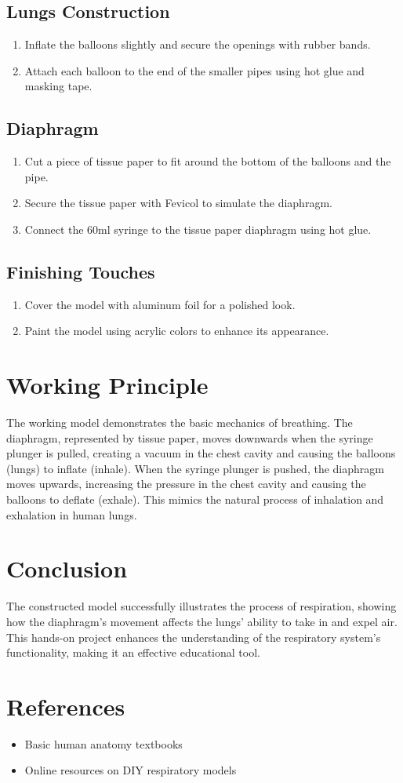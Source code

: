 \documentclass[12pt]{article}
\begin{document}
\subsection{Lungs Construction}
\begin{enumerate}
    \item Inflate the balloons slightly and secure the openings with rubber bands.
    \item Attach each balloon to the end of the smaller pipes using hot glue and masking tape.
\end{enumerate}

\subsection{Diaphragm}
\begin{enumerate}
    \item Cut a piece of tissue paper to fit around the bottom of the balloons and the pipe.
    \item Secure the tissue paper with Fevicol to simulate the diaphragm.
    \item Connect the 60ml syringe to the tissue paper diaphragm using hot glue.
\end{enumerate}

\subsection{Finishing Touches}
\begin{enumerate}
    \item Cover the model with aluminum foil for a polished look.
    \item Paint the model using acrylic colors to enhance its appearance.
\end{enumerate}

\section{Working Principle}
The working model demonstrates the basic mechanics of breathing. The diaphragm, represented by tissue paper, moves downwards when the syringe plunger is pulled, creating a vacuum in the chest cavity and causing the balloons (lungs) to inflate (inhale). When the syringe plunger is pushed, the diaphragm moves upwards, increasing the pressure in the chest cavity and causing the balloons to deflate (exhale). This mimics the natural process of inhalation and exhalation in human lungs.

\section{Conclusion}
The constructed model successfully illustrates the process of respiration, showing how the diaphragm’s movement affects the lungs' ability to take in and expel air. This hands-on project enhances the understanding of the respiratory system’s functionality, making it an effective educational tool.

\section{References}
\begin{itemize}
    \item Basic human anatomy textbooks
    \item Online resources on DIY respiratory models
\end{itemize}
\end{document}
